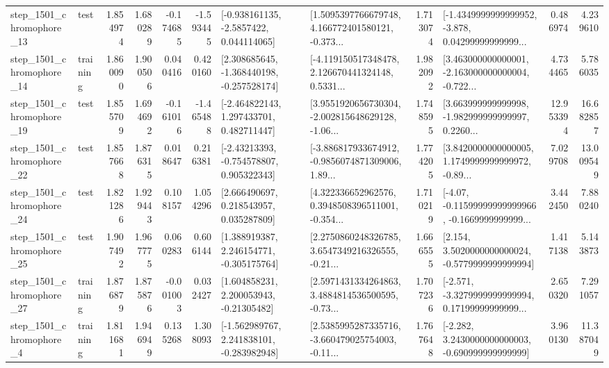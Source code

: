 \begin{tabular}{llrrrrllrlrr}
 step\_1501\_chromophore\_13 &      test &      1.854974 &    1.680289 &     -0.174685 & -1.593445 &     [-0.938161135, -2.5857422, 0.044114065] &  [1.5095397766679748, 4.166772401580121, -0.373... &       1.713074 &  [-1.4349999999999952, -3.878, 0.04299999999999... &            0.486974 &          4.239610 \\
 step\_1501\_chromophore\_14 &  training &      1.860090 &    1.900506 &      0.040416 &  0.420160 &   [2.308685645, -1.368440198, -0.257528174] &  [-4.119150517348478, 2.126670441324148, 0.5331... &       1.982092 &  [3.463000000000001, -2.163000000000004, -0.722... &            4.734465 &          5.786035 \\
 step\_1501\_chromophore\_19 &      test &      1.855709 &    1.694692 &     -0.161016 & -1.465488 &    [-2.464822143, 1.297433701, 0.482711447] &  [3.9551920656730304, -2.002815648629128, -1.06... &       1.748595 &  [3.663999999999998, -1.982999999999997, 0.2260... &           12.953394 &         16.682857 \\
 step\_1501\_chromophore\_22 &      test &      1.857668 &    1.876315 &      0.018647 &  0.216381 &    [-2.43213393, -0.754578807, 0.905322343] &  [-3.886817933674912, -0.9856074871309006, 1.89... &       1.774205 &  [3.8420000000000005, 1.1749999999999972, -0.89... &            7.029708 &         13.009549 \\
 step\_1501\_chromophore\_24 &      test &      1.821286 &    1.929443 &      0.108157 &  1.054296 &     [2.666490697, 0.218543957, 0.035287809] &  [4.322336652962576, 0.3948508396511001, -0.354... &       1.710219 &  [-4.07, -0.11599999999999966, -0.1669999999999... &            3.442450 &          7.880240 \\
 step\_1501\_chromophore\_25 &      test &      1.907492 &    1.967775 &      0.060283 &  0.606144 &    [1.388919387, 2.246154771, -0.305175764] &  [2.2750860248326785, 3.6547349216326555, -0.21... &       1.666555 &   [2.154, 3.5020000000000024, -0.5779999999999994] &            1.417138 &          5.143873 \\
 step\_1501\_chromophore\_27 &  training &      1.876879 &    1.875876 &     -0.001003 &  0.032427 &     [1.604858231, 2.200053943, -0.21305482] &  [2.5971431334264863, 3.4884814536500595, -0.73... &       1.707236 &  [-2.571, -3.3279999999999994, 0.17199999999999... &            2.650320 &          7.291057 \\
  step\_1501\_chromophore\_4 &  training &      1.811681 &    1.946949 &      0.135268 &  1.308093 &   [-1.562989767, 2.241838101, -0.283982948] &  [2.5385995287335716, -3.660479025754003, -0.11... &       1.767648 &   [-2.282, 3.2430000000000003, -0.690999999999999] &            3.960130 &         11.387049 \\

\end{tabular}
